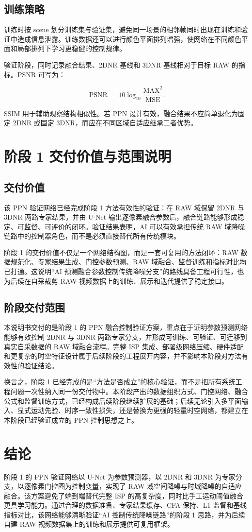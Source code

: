 \documentclass[UTF8,zihao=-4]{ctexart}
\begin{document}
\subsection{训练策略}

训练时按 scene 划分训练集与验证集，避免同一场景的相邻帧同时出现在训练和验证中造成信息泄露。训练数据还可以进行颜色平面排列增强，使网络在不同颜色平面和局部排列下学习更稳健的控制规律。

验证阶段，同时记录融合结果、2DNR 基线和 3DNR 基线相对于目标 RAW 的指标。PSNR 可写为：

\[
\operatorname{PSNR}=10\log_{10}\frac{\mathrm{MAX}^2}{\operatorname{MSE}}.
\]

SSIM 用于辅助观察结构相似性。若 PPN 设计有效，融合结果不应简单退化为固定 2DNR 或固定 3DNR，而应在不同区域自适应继承二者优势。

\section{阶段 1 交付价值与范围说明}

\subsection{交付价值}

该 PPN 验证网络已经完成阶段 1 方法有效性的验证：在 RAW 域保留 2DNR 与 3DNR 两路专家结果，并由 U-Net 输出逐像素融合参数后，融合链路能够形成稳定、可监督、可评价的闭环。验证结果表明，AI 可以有效承担传统 RAW 域降噪链路中的控制器角色，而不是必须直接替代所有传统模块。

阶段 1 的交付价值不仅是一个网络结构图，而是一套可复用的方法闭环：RAW 数据规范化、专家结果生成、门控参数预测、RAW 域融合、监督训练和指标对比均已打通。这说明“AI 预测融合参数控制传统降噪分支”的路线具备工程可行性，也为后续在自采裁剪 RAW 视频数据上的训练、展示和迭代提供了稳定接口。

\subsection{阶段交付范围}

本说明书交付的是阶段 1 的 PPN 融合控制验证方案，重点在于证明参数预测网络能够有效控制 2DNR 与 3DNR 两路专家分支，并形成可训练、可验证、可迁移到真实自采数据的 RAW 域融合流程。完整 ISP 集成、部署级网络压缩、硬件适配和更复杂的时空特征设计属于后续阶段的工程展开内容，并不影响本阶段对方法有效性的验证结论。

换言之，阶段 1 已经完成的是“方法是否成立”的核心验证，而不是把所有系统工程问题一次性纳入同一份交付物中。本阶段产出的数据组织方式、门控网络、融合公式和监督训练方式，已经构成后续阶段继续扩展的基础；后续无论引入多平面输入、显式运动先验、时序一致性损失，还是替换为更强的轻量时空网络，都建立在本阶段已经验证成立的 PPN 控制思想之上。

\section{结论}

阶段 1 的 PPN 验证网络以 U-Net 为参数预测器，以 2DNR 和 3DNR 为专家分支，以逐像素门控图为控制变量，实现了 RAW 域空间降噪与时域降噪的自适应融合。该方案避免了端到端替代完整 ISP 的高复杂度，同时比手工运动阈值融合更具学习能力。通过合理的数据准备、专家结果缓存、CFA 保持、L1 监督和基线指标对比，该网络能够清晰验证“AI 控制传统降噪链路”的阶段 1 思路，并为后续自建 RAW 视频数据集上的训练和展示提供可复用框架。
\end{document}

